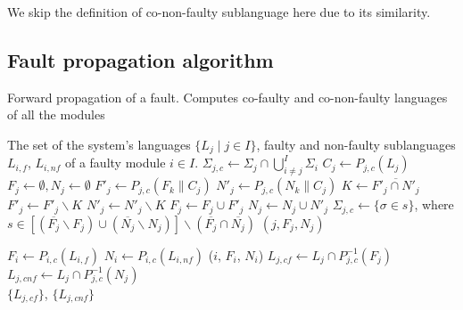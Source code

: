 We skip the definition of co-non-faulty sublanguage here due to its similarity. 


\subsection{Fault propagation algorithm}

\begin{alg}[!ht]
\caption{Forward propagation of a fault. Computes co-faulty and
co-non-faulty languages of all the modules}
\begin{algorithmic}[1]
	\Require The set of the system's languages $\{L_j\mid j \in I\}$, faulty and
	non-faulty sublanguages $L_{i,f}$, $L_{i,nf}$ of a faulty module $i\in I$.
	\label{alg:fcf_init}
		\State $\Sigma_{j,c} \leftarrow \Sigma_j \cap \bigcup_{i\neq j}^I\Sigma_i$
		\State $C_j \leftarrow P_{j,c}(L_j)$
		\State $F_j \leftarrow \emptyset, N_j \leftarrow \emptyset$
	\EndFor
			\State $F'_j \leftarrow P_{j,c}(F_k \parallel C_j)$
			\label{alg:fcf_partial_begin}
			\State $N'_j \leftarrow P_{j,c}(N_k \parallel C_j)$ 
			\State $K \leftarrow \overline{F'_j \cap N'_j}$
			\State $F'_j \leftarrow F'_j \backslash K$
			\State $N'_j \leftarrow N'_j \backslash K$
			\label{alg:fcf_partial_end}
				\label{alg:fcf_update}
				\State $F_j \leftarrow F_j \cup F'_j$
				\State $N_j \leftarrow N_j \cup N'_j$
				\State $\Sigma_{j,c} \leftarrow
					\{\sigma \in s \}$, where
				\State $s \in
						\left[(\overline{F_j} \backslash F_j) \cup
						(\overline{N_j} \backslash N_j)\right] \backslash	
						(\overline{F_j} \cap \overline{N_j})
						$
				\State {}$(j, F_j, N_j)$
			\EndIf
		\EndFor
	\EndProcedure
	
	\State $F_i \leftarrow P_{i,c}(L_{i,f})$
		\label{alg:fcf_Fi}
	\State $N_i \leftarrow P_{i,c}(L_{i,nf})$
	\State {}($i$, $F_i$, $N_i$)
		\label{alg:fcf_final}
		\State $L_{j,cf} \leftarrow L_j \cap P_{j,c}^{-1}(F_j)$
		\State $L_{j,cnf} \leftarrow L_j \cap P_{j,c}^{-1}(N_j)$
	\EndFor
	\\
	\Return $\{L_{j,cf}\}$, $\{L_{j,cnf}\}$
\end{algorithmic}
\label{alg:propagate_fn}
\end{alg}


